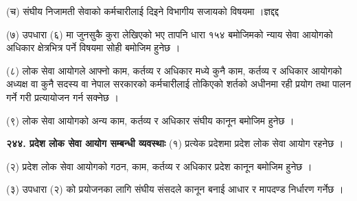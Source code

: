 (च) संघीय निजामती सेवाको कर्मचारीलाई दिइने विभागीय सजायको विषयमा ।ज्ञद्दद्द

(७) उपधारा (६) मा जुनसुकै कुरा लेखिएको भए तापनि धारा १५४ बमोजिमको न्याय सेवा आयोगको अधिकार क्षेत्रभित्र पर्ने विषयमा सोही
बमोजिम हुनेछ ।

(८) लोक सेवा आयोगले आफ्नो काम, कर्तव्य र अधिकार मध्ये कुनै काम, कर्तव्य र अधिकार आयोगको अध्यक्ष वा कुनै सदस्य वा नेपाल
सरकारको कर्मचारीलाई तोकिएको शर्तको अधीनमा रही प्रयोग तथा पालन गर्ने गरी प्रत्यायोजन गर्न सक्नेछ ।

(९) लोक सेवा आयोगको अन्य काम, कर्तव्य र अधिकार संघीय कानून बमोजिम हुनेछ ।

\textbf{२४४. प्रदेश लोक सेवा आयोग सम्बन्धी व्यवस्थाः} (१) प्रत्येक प्रदेशमा प्रदेश लोक सेवा आयोग रहनेछ ।

(२) प्रदेश लोक सेवा आयोगको गठन, काम, कर्तव्य र अधिकार प्रदेश कानून बमोजिम हुनेछ ।

(३) उपधारा (२) को प्रयोजनका लागि संघीय संसदले कानून बनाई आधार र मापदण्ड निर्धारण गर्नेछ ।